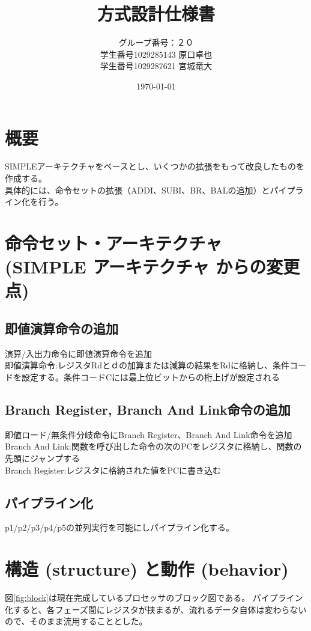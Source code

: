 \documentclass{jsreport}
\title{方式設計仕様書}
\author{グループ番号：２０　\\ 学生番号1029285143 原口卓也\\ 学生番号1029287621 宮城竜大}
\date{\today}
\begin{document}
\maketitle
\clearpage

\section{概要}
        SIMPLEアーキテクチャをベースとし、いくつかの拡張をもって改良したものを作成する。\\
       具体的には、命令セットの拡張（ADDI、SUBI、BR、BALの追加）とパイプライン化を行う。

\section{命令セット・アーキテクチャ (SIMPLE アーキテクチャ からの変更点)}
        \subsection{即値演算命令の追加}
                演算/入出力命令に即値演算命令を追加\\
        即値演算命令:レジスタRdとｄの加算または減算の結果をRdに格納し、条件コードを設定する。条件コードCには最上位ビットからの桁上げが設定される

    \subsection{Branch Register, Branch And Link命令の追加}
                即値ロード/無条件分岐命令にBranch Register、Branch And Link命令を追加\\
        Branch And Link:関数を呼び出した命令の次のPCをレジスタに格納し、関数の先頭にジャンプする\\
        Branch Register:レジスタに格納された値をPCに書き込む

    \subsection{パイプライン化}
        p1/p2/p3/p4/p5の並列実行を可能にしパイプライン化する。

\section{構造 (structure) と動作 (behavior)}
図\ref{fig:block}は現在完成しているプロセッサのブロック図である。
パイプライン化すると、各フェーズ間にレジスタが挟まるが、流れるデータ自体は変わらないので、そのまま流用することとした。
\end{document}
